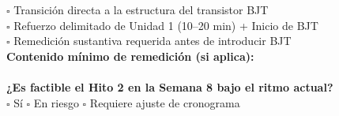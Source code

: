 \documentclass[11pt, a4paper]{article}
\begin{document}
\begin{tcolorbox}[colback=blue!5, colframe=blue!75!black, title=\textbf{Decisión Pedagógica para la Siguiente Sesión}]
$\square$ Transición directa a la estructura del transistor BJT\\
$\square$ Refuerzo delimitado de Unidad 1 (10–20 min) + Inicio de BJT\\
$\square$ Remedición sustantiva requerida antes de introducir BJT\\[0.3cm]
\textbf{Contenido mínimo de remedición (si aplica):}\\[0.3cm] \hrulefill \\[0.3cm]
\textbf{¿Es factible el Hito 2 en la Semana 8 bajo el ritmo actual?}\\
$\square$ Sí \hspace{1cm} $\square$ En riesgo \hspace{1cm} $\square$ Requiere ajuste de cronograma
\end{tcolorbox}
\end{document}
